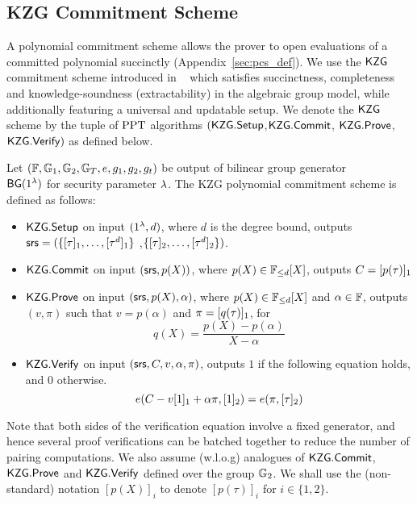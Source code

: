 \subsection{KZG Commitment Scheme}
\label{sec:KZG}
A polynomial commitment scheme allows the prover to open evaluations of a committed polynomial succinctly (Appendix~\ref{sec:pcs_def}).
We use the $\mathsf{KZG}$ commitment scheme introduced in ~\cite{AC:KatZavGol10} which satisfies succinctness, completeness and knowledge-soundness (extractability)
in the algebraic group model, while additionally featuring a universal and updatable setup. We denote the $\mathsf{KZG}$ scheme by the tuple of $\mathrm{PPT}$ algorithms $(\mathsf{KZG.Setup}$,$\mathsf{KZG.Commit}$, $\mathsf{KZG.Prove}$, $\mathsf{KZG.Verify})$ as defined below.
\begin{definition}
	Let $(\mathbb{F},\mathbb{G}_1,\mathbb{G}_2,\mathbb{G}_T, e, g_1, g_2, g_t)$ be output of bilinear group generator \\
	$\mathsf{BG}(1^{\lambda})$ for security parameter $\lambda$.
	The KZG polynomial commitment scheme is defined as follows:
	\begin{itemize}[leftmargin=1em]
		\item $\mathsf{KZG.Setup}$ on input $(1^{\lambda},d)$, where $d$ is the degree bound, outputs
		$\mathsf{srs} = (\{[\tau]_1,\ldots,[\tau^d]_1\}$ ,$\{[\tau]_2,\ldots,[\tau^d]_2\})$.
		\item $\mathsf{KZG.Commit}$ on input $(\mathsf{srs},p(X))$, where $p(X) \in \mathbb{F}_{\leq d}[X]$, outputs $C=[p(\tau)]_1$
		\item $\mathsf{KZG.Prove}$ on input $(\mathsf{srs},p(X),\alpha)$, where $p(X) \in \mathbb{F}_{\leq d}[X]$ and $\alpha\in \mathbb{F}$, outputs $(v, \pi)$ such that $v=p(\alpha)$ and $\pi=[q(\tau)]_1$, for
		\[ q(X)=\frac{p(X)-p(\alpha)}{X-\alpha} \]
		\item $\mathsf{KZG.Verify}$ on input $(\mathsf{srs},C,v, \alpha,\pi)$, outputs $1$ if the following equation holds, and $0$ otherwise.
		\[ e(C-v[1]_1 + \alpha\pi, [1]_2) = e(\pi, [\tau]_2) \]

	\end{itemize}
\end{definition}
Note that both sides of the verification equation involve a fixed generator, and hence several proof verifications
can be batched together to reduce the number of pairing computations.
We also assume (w.l.o.g) analogues of $\mathsf{KZG.Commit}$, $\mathsf{KZG.Prove}$ and $\mathsf{KZG.Verify}$ defined over the group $\mathbb{G}_2$.
We shall use the (non-standard) notation $[p(X)]_i$ to denote $[p(\tau)]_i$ for $i\in \{1,2\}$.
